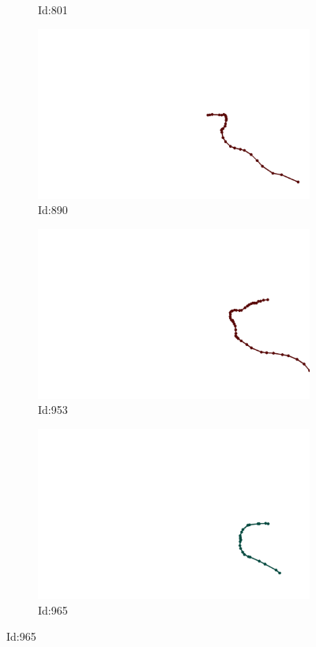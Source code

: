 \documentclass[12pt,twoside]{report}
\begin{document}
\begin{figure}
\begin{subfigure}[b]{0.20\textwidth}
\caption{Id:801}
\end{subfigure}
\begin{subfigure}[b]{0.20\textwidth}
\centering
\includegraphics[width=\textwidth]{../../trajectories/890.png}
\caption{Id:890}
\end{subfigure}
\begin{subfigure}[b]{0.20\textwidth}
\centering
\includegraphics[width=\textwidth]{../../trajectories/953.png}
\caption{Id:953}
\end{subfigure}
\begin{subfigure}[b]{0.20\textwidth}
\centering
\includegraphics[width=\textwidth]{../../trajectories/965.png}
\caption{Id:965}
\end{subfigure}
\end{figure}
\end{document}

